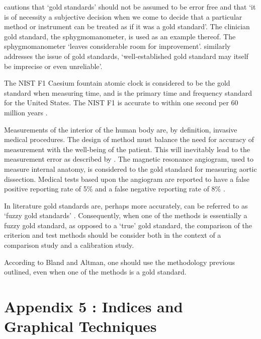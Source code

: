 \documentclass[12pt, a4paper]{report}
\theoremstyle{plain}
\theoremstyle{definition}
\theoremstyle{remark}
\begin{document}


\citet[p.47]{DunnSEME} cautions that `gold standards' should not be
assumed to be error free and that `it is of necessity a subjective
decision when we come to decide that a particular method or
instrument can be treated as if it was a gold standard'. The
clinician gold standard, the sphygmomanometer, is used as an
example thereof.  The sphygmomanometer `leaves considerable room
for improvement'. \citet{pizzi} similarly addresses the issue of gold standards, `well-established gold
standard may itself be imprecise or even unreliable'.


The NIST F1 Caesium fountain atomic clock is considered to be the gold standard when measuring time, and is the primary time and
frequency standard for the United States. The NIST F1 is accurate to within one second per 60 million years \citep{NIST}.

Measurements of the interior of the human body are, by definition,
invasive medical procedures. The design of method must balance the need for accuracy of measurement with the well-being of the	patient. This will inevitably lead to the measurement error as described by \citet{DunnSEME}. The magnetic resonance angiogram,
used to measure internal anatomy, is considered to the gold	standard for measuring aortic dissection. Medical tests based upon
the angiogram are reported to have a false positive reporting rate
of 5\% and a false negative reporting rate of 8\% \citep{ACR}.

In literature gold standards are, perhaps more accurately, can be referred to as
`fuzzy gold standards' \citep{phelps}. Consequently, when one of the methods is
essentially a fuzzy gold standard, as opposed to a `true' gold standard, the comparison of the criterion and test methods should
be consider both in the context of a comparison study and a	calibration study.




According to Bland and Altman, one should use the methodology
previous outlined, even when one of the methods is a gold standard.



\section{Appendix 5 : Indices and Graphical Techniques}




	
	
\end{document}
